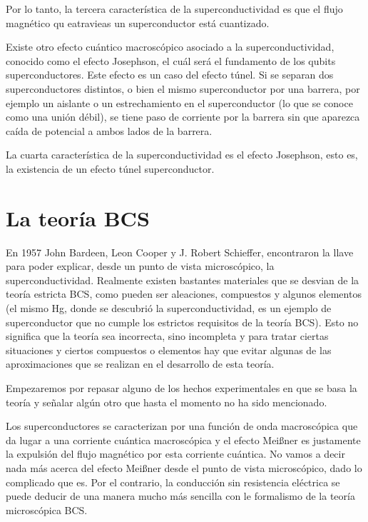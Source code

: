 Por lo tanto, la tercera característica de la superconductividad es que el flujo magnético qu eatravieas un superconductor está cuantizado.

Existe otro efecto cuántico macroscópico asociado a la superconductividad, conocido como el efecto Josephson, el cuál será el fundamento de los qubits superconductores. Este efecto es un caso del efecto túnel. Si se separan dos superconductores distintos, o bien el mismo superconductor por una barrera, por ejemplo un aislante o un estrechamiento en el superconductor (lo que se conoce como una unión débil), se tiene paso de corriente por la barrera sin que aparezca caída de potencial a ambos lados de la barrera.

La cuarta característica de la superconductividad es el efecto Josephson, esto es, la existencia de un efecto túnel superconductor.


\section{La teoría BCS}

En 1957 John Bardeen, Leon Cooper y J. Robert Schieffer, encontraron la llave para poder explicar, desde un punto de vista microscópico, la superconductividad. Realmente existen bastantes materiales que se desvian de la teoría estricta BCS, como pueden ser aleaciones, compuestos y algunos elementos (el mismo Hg, donde se descubrió la superconductividad, es un ejemplo de superconductor que no cumple los estrictos requisitos de la teoría BCS). Esto no significa que la teoría sea incorrecta, sino incompleta y para tratar ciertas situaciones y ciertos compuestos o elementos hay que evitar algunas de las aproximaciones que se realizan en el desarrollo de esta teoría.

Empezaremos por repasar alguno de los hechos experimentales en que se basa la teoría y señalar algún otro que hasta el momento no ha sido mencionado.

Los superconductores se caracterizan por una función de onda macroscópica que da lugar a una corriente cuántica macroscópica y el efecto Meißner es justamente la expulsión del flujo magnético por esta corriente cuántica. No vamos a decir nada más acerca del efecto Meißner desde el punto de vista microscópico, dado lo complicado que es. Por el contrario, la conducción sin resistencia eléctrica se puede deducir de una manera mucho más sencilla con le formalismo de la teoría microscópica BCS.


